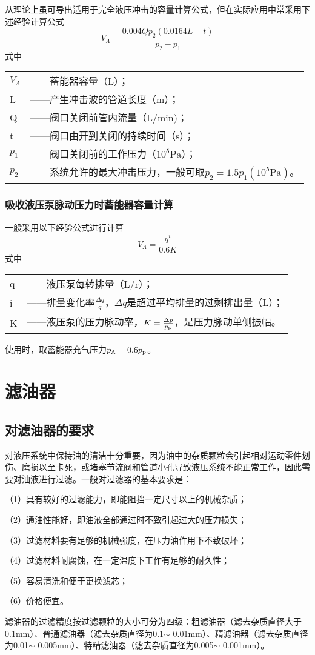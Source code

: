 从理论上虽可导出适用于完全液压冲击的容量计算公式，但在实际应用中常采用下述经验计算公式
\begin{equation}
V_{\Lambda}=\frac{0.004Qp_{2}(0.0164L-t)}{p_{2}-p_{1}}
\end{equation}
式中
\begin{tabular}[t]{ll}
$V_{\Lambda}$&——蓄能器容量（L）；\\
L&——产生冲击波的管道长度（m）；\\
Q&——阀口关闭前管内流量（L/min)；\\
t&——阀口由开到关闭的持续时间（s）；\\
$p_{1}$&——阀口关闭前的工作压力（$10^{5}\mbox{Pa}$）；\\
$p_{2}$&——系统允许的最大冲击压力，一般可取$p_{2}=1.5p_{1}(10^{5}\mbox{Pa})$。
\end{tabular}

\subsubsection{吸收液压泵脉动压力时蓄能器容量计算}

一般采用以下经验公式进行计算
\begin{equation}
V_{\Lambda}=\frac{q^{i}}{0.6K}
\end{equation}
式中
\begin{tabular}[t]{ll}
q&——液压泵每转排量（L/r）；\\
i&——排量变化率$\frac{\Delta{q}}{q}$，$\Delta{q}$是超过平均排量的过剩排出量（L）；\\
K&——液压泵的压力脉动率，$K=\frac{\Delta{p}}{p_{\mbox{\scriptsize p}}}$，是压力脉动单侧振幅。
\end{tabular}

使用时，取蓄能器充气压力$p_{\Lambda}=0.6p_{\mbox{\scriptsize p}}$。

\section{滤油器}

\subsection{对滤油器的要求}

对液压系统中保持油的清洁十分重要，因为油中的杂质颗粒会引起相对运动零件划伤、磨损以至卡死，或堵塞节流阀和管道小孔导致液压系统不能正常工作，因此需要对油液进行过滤。一般对过滤器的基本要求是：

（1）具有较好的过滤能力，即能阻挡一定尺寸以上的机械杂质；

（2）通油性能好，即油液全部通过时不致引起过大的压力损失；

（3）过滤材料要有足够的机械强度，在压力油作用下不致破坏；

（4）过滤材料耐腐蚀，在一定温度下工作有足够的耐久性；

（5）容易清洗和便于更换滤芯；

（6）价格便宜。

滤油器的过滤精度按过滤颗粒的大小可分为四级：粗滤油器（滤去杂质直径大于0.1mm）、普通滤油器（滤去杂质直径为0.1$\sim$ 0.01mm）、精滤油器（滤去杂质直径为0.01$\sim$ 0.005mm）、特精滤油器（滤去杂质直径为0.005$\sim$ 0.001mm）。
